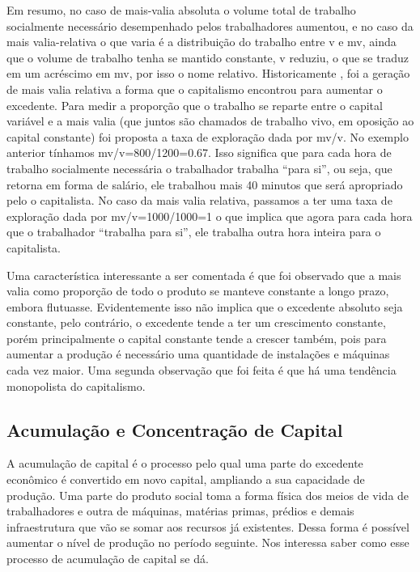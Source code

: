 Em resumo, no caso de mais-valia absoluta o volume total de trabalho socialmente necessário desempenhado pelos trabalhadores aumentou, e no caso da mais valia-relativa o que varia é a distribuição do trabalho entre v e mv, ainda que o volume de trabalho tenha se mantido constante, v reduziu, o que se traduz em um acréscimo em mv, por isso o nome relativo. Historicamente , foi a geração de mais valia relativa a forma que o capitalismo encontrou para aumentar o excedente. Para medir a proporção que o trabalho se reparte entre o capital variável e a mais valia (que juntos são chamados de trabalho vivo, em oposição ao capital constante) foi proposta a taxa de exploração dada por mv/v. No exemplo anterior tínhamos mv/v=800/1200=0.67. Isso significa que para cada hora de trabalho socialmente necessária o trabalhador trabalha “para si'', ou seja, que retorna em forma de salário, ele trabalhou mais 40 minutos que será apropriado pelo o capitalista. No caso da mais valia relativa, passamos a ter uma taxa de exploração dada por mv/v=1000/1000=1 o que implica que agora para cada hora que o trabalhador “trabalha para si'', ele trabalha outra hora inteira para o capitalista.

Uma característica interessante a ser comentada é que foi observado que a mais valia como proporção de todo o produto se manteve constante a longo prazo, embora flutuasse. Evidentemente isso não implica que o excedente absoluto seja constante, pelo contrário, o excedente tende a ter um crescimento constante, porém  principalmente o capital constante tende a crescer também, pois para aumentar a produção é necessário uma quantidade de instalações e máquinas cada vez maior. Uma segunda observação que foi feita é que há uma tendência monopolista do capitalismo.

\subsection{Acumulação e Concentração de Capital}

A acumulação de capital é o processo pelo qual uma parte do excedente econômico é convertido em novo capital, ampliando a sua capacidade de produção. Uma parte do produto social toma  a forma física dos meios de vida de trabalhadores e outra de máquinas, matérias primas, prédios e demais infraestrutura que vão se somar aos recursos já existentes. Dessa forma é possível aumentar o nível de produção no período seguinte. Nos interessa saber como esse processo de acumulação de capital se dá.

